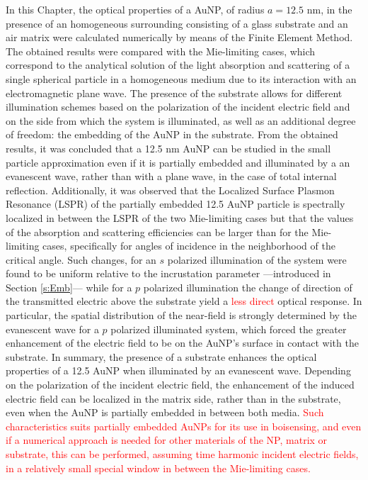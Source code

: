 In this Chapter, the optical properties of a AuNP, of radius $a=12.5$ nm, in the presence of an homogeneous surrounding consisting of a glass substrate and an air matrix were calculated numerically by means of the Finite Element Method. The obtained results were compared with the Mie-limiting cases, which correspond to the analytical solution of the light absorption and scattering of a single spherical particle in a homogeneous medium due to its interaction with an electromagnetic plane wave.  The presence of the substrate allows for different illumination schemes based on the polarization of the incident electric field and on the side from which the system is illuminated, as well as an additional degree of freedom: the embedding of the AuNP in the substrate. From the obtained results, it was concluded that a 12.5 nm AuNP can be studied in the small particle approximation even if it is partially embedded and illuminated by a an evanescent wave, rather than with a plane wave, in the case of total internal reflection. Additionally, it was observed that the Localized Surface Plasmon Resonance (LSPR) of the partially embedded 12.5 AuNP particle is spectrally localized in between the LSPR of the two Mie-limiting cases but that the values of the absorption and scattering efficiencies can be larger than for the Mie-limiting cases, specifically for angles of incidence in the neighborhood of the critical angle. Such changes, for an $s$ polarized illumination of the system were found to be uniform relative to the incrustation parameter ---introduced in Section \ref{s:Emb}--- while for a $p$ polarized illumination the change of  direction of the transmitted electric above the substrate yield a \textcolor{red}{less direct} optical response. In particular, the spatial distribution of the near-field is strongly determined by the evanescent wave for a $p$ polarized illuminated system, which forced the greater enhancement of the electric field to be on the AuNP's surface in contact with the substrate. In summary, the presence of a substrate enhances the optical properties of a 12.5 AuNP when illuminated by an evanescent wave. Depending on the polarization of the incident electric field, the enhancement of the induced electric field can be localized in the matrix side, rather than in the substrate, even when the AuNP is partially embedded in between both media. \textcolor{red}{Such characteristics suits partially embedded AuNPs for its use in boisensing, and even if a numerical approach is needed for other materials of the NP, matrix or substrate, this can be performed, assuming time harmonic incident electric fields, in a relatively small special window in between the Mie-limiting cases.}
